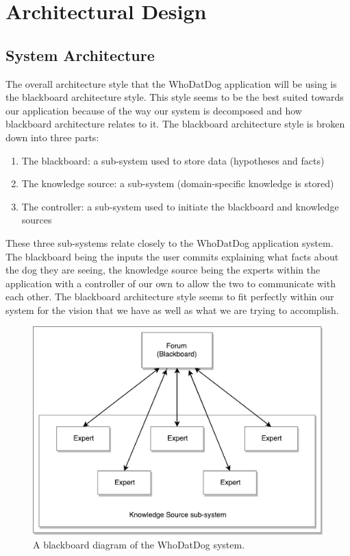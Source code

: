 \documentclass[]{article}
\begin{document}



\section{Architectural Design}
\label{sec:architectural_design}

\subsection{System Architecture}
\label{sub:system_architecture}

The overall architecture style that the WhoDatDog application will be using is the blackboard architecture style. This style seems to be the best suited towards our application because of the way our system is decomposed and how blackboard architecture relates to it. The blackboard architecture style is broken down into three parts:

\begin{enumerate}[1)]
	\item The blackboard: a sub-system used to store data (hypotheses and facts)
	\item The knowledge source: a sub-system (domain-specific knowledge is stored)
	\item The controller: a sub-system used to initiate the blackboard and knowledge sources
\end{enumerate}

These three sub-systems relate closely to the WhoDatDog application system. The blackboard being the inputs the user commits explaining what facts about the dog they are seeing, the knowledge source being the experts within the application with a controller of our own to allow the two to communicate with each other. The blackboard architecture style seems to fit perfectly within our system for the vision that we have as well as what we are trying to accomplish.

\begin{figure}[H]
	\centering
	\includegraphics[width=\textwidth]{blackboardDiagram.pdf}
	\caption{\label{fig:blackboarddiagram} A blackboard diagram of the WhoDatDog system.}
\end{figure}
\end{document}
